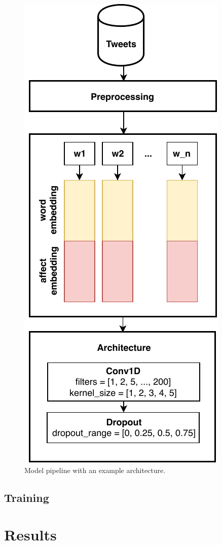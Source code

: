 \documentclass[10pt, a4paper]{article}
\begin{document}
\begin{figure}
\begin{center}
\includegraphics[width=0.7\columnwidth]{images/architecture.pdf}
\caption{Model pipeline with an example architecture.}
\label{fig:figure1}
\end{center}
\end{figure}


\subsection{Training}

\section{Results}
\end{document}
